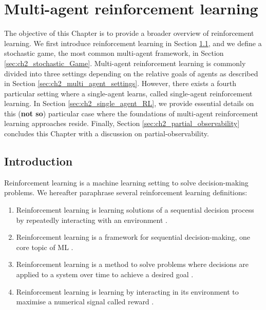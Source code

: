 \chapter{Multi-agent reinforcement learning} \label{ch:marl}

\begin{chapter_outline}

The objective of this Chapter is to provide a broader overview of reinforcement learning.
We first introduce reinforcement learning in Section \ref{sec:ch2_Introduction}, and we define a stochastic game, the most common multi-agent framework, in Section \ref{sec:ch2_stochastic_Game}.
Multi-agent reinforcement learning is commonly divided into three settings depending on the relative goals of agents as described in Section \ref{sec:ch2_multi_agent_settings}.
However, there exists a fourth particular setting where a single-agent learns, called single-agent reinforcement learning.
In Section \ref{sec:ch2_single_agent_RL}, we provide essential details on this (\textbf{not so}) particular case where the foundations of multi-agent reinforcement learning approaches reside.
Finally, Section \ref{sec:ch2_partial_observability} concludes this Chapter with a discussion on partial-observability.

\end{chapter_outline}

\section{Introduction} 
\label{sec:ch2_Introduction}
Reinforcement learning is a machine learning setting to solve decision-making problems.
We hereafter paraphrase several reinforcement learning definitions:
\begin{enumerate}
\item Reinforcement learning is learning solutions of a sequential decision process by repeatedly interacting with an environment \citep{marl-book}.
\item Reinforcement learning is a framework for sequential decision-making, one core topic of ML \citep{introDeepRL}.
\item Reinforcement learning is a method to solve problems where decisions are applied to a system over time to achieve a desired goal \citep{BusoniuErnstBook}.
\item Reinforcement learning is learning by interacting in its environment to maximise a numerical signal called reward \citep{sutton2018reinforcement}.
\end{enumerate}

